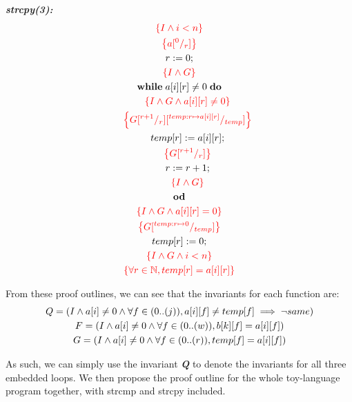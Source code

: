 \documentclass [a4paper, 12pt, fleqn]  {article}
\newcommand{\assn}[1]{{\color{red}\left\{#1\right\}}}
\begin{document}
\textit{\textbf{strcpy(3):}}
\begin{gather*}
\assn{I \AND i < n} \\
\assn{a \subst 0r} \\
r \Ass 0; \\
\assn{I \AND G} \\
\WHILE \hspace{0.1cm} a[i][r] \neq 0 \hspace{0.1cm} \DO \\
\hspace{0.6cm} \assn{I \AND G \AND a[i][r] \neq 0} \\
\hspace{0.6cm} \assn{G \subst {r + 1} r \subst {temp:r \mapsto a[i][r]}{temp}} \\
\hspace{0.6cm} temp[r] \Ass a[i][r]; \\
\hspace{0.6cm} \assn{G \subst {r + 1}  {r}   } \\
\hspace{0.6cm} r \Ass r + 1; \\
\hspace{0.6cm} \assn{I \AND G} \\
\OD \\
\assn{I \AND G \AND a[i][r] = 0} \\
\assn{G \subst {temp:  r \mapsto 0}  {temp}  } \\
temp[r] \Ass 0; \\
\assn{I \AND G \AND i < n} \\
\assn{ \forall r \in \nat , temp[r] = a[i][r] } \\
\end{gather*}

From these proof outlines, we can see that the invariants for each function are:
\begin{gather*}
Q = (I \wedge a[i] \neq 0 \wedge \forall f \in (0 .. (j)),  a[i][f] \neq temp[f] \implies \neg same) \\
F = (I \wedge a[i] \neq 0 \wedge \forall f \in (0..(w)), b[k][f] = a[i][f]) \\
G = (I \wedge a[i] \neq 0 \wedge \forall f \in (0..(r)), temp[f] = a[i][f])
\end{gather*}

As such, we can simply use the invariant \textit{\textbf{Q}} to denote the invariants for all three embedded loops. We then propose the proof outline for the whole toy-language program together, with strcmp and strcpy included.
\end{document}
